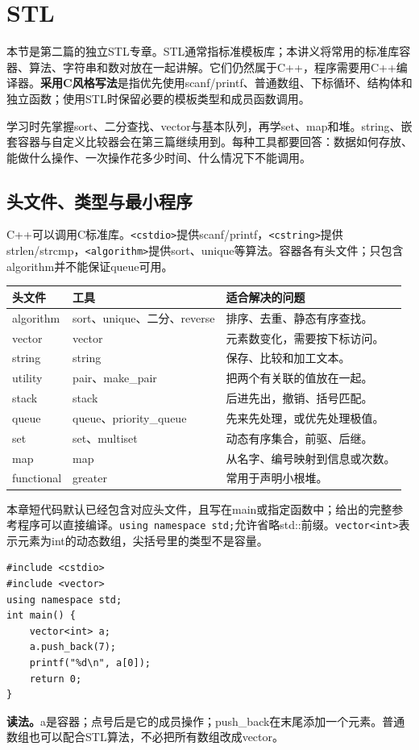 \section{STL}
\label{chap:stl}
本节是第二篇的独立STL专章。STL通常指标准模板库；本讲义将常用的标准库容器、算法、字符串和数对放在一起讲解。它们仍然属于C++，程序需要用C++编译器。\textbf{采用C风格写法}是指优先使用scanf/printf、普通数组、下标循环、结构体和独立函数；使用STL时保留必要的模板类型和成员函数调用。

学习时先掌握sort、二分查找、vector与基本队列，再学set、map和堆。string、嵌套容器与自定义比较器会在第三篇继续用到。每种工具都要回答：数据如何存放、能做什么操作、一次操作花多少时间、什么情况下不能调用。

\subsection{头文件、类型与最小程序}
C++可以调用C标准库。\texttt{<cstdio>}提供scanf/printf，\texttt{<cstring>}提供strlen/strcmp，\texttt{<algorithm>}提供sort、unique等算法。容器各有头文件；只包含algorithm并不能保证queue可用。
\begin{longtable}{P{3.4cm}P{4.1cm}P{6.7cm}}
\toprule 头文件 & 工具 & 适合解决的问题\\\midrule\endhead
algorithm & sort、unique、二分、reverse & 排序、去重、静态有序查找。\\
vector & vector & 元素数变化，需要按下标访问。\\
string & string & 保存、比较和加工文本。\\
utility & pair、make\_pair & 把两个有关联的值放在一起。\\
stack & stack & 后进先出，撤销、括号匹配。\\
queue & queue、priority\_queue & 先来先处理，或优先处理极值。\\
set & set、multiset & 动态有序集合，前驱、后继。\\
map & map & 从名字、编号映射到信息或次数。\\
functional & greater & 常用于声明小根堆。\\
\bottomrule
\end{longtable}
本章短代码默认已经包含对应头文件，且写在main或指定函数中；给出的完整参考程序可以直接编译。\texttt{using namespace std;}允许省略std::前缀。\texttt{vector<int>}表示元素为int的动态数组，尖括号里的类型不是容量。
\begin{lstlisting}
#include <cstdio>
#include <vector>
using namespace std;
int main() {
    vector<int> a;
    a.push_back(7);
    printf("%d\n", a[0]);
    return 0;
}
\end{lstlisting}
\textbf{读法。}a是容器；点号后是它的成员操作；push\_back在末尾添加一个元素。普通数组也可以配合STL算法，不必把所有数组改成vector。

